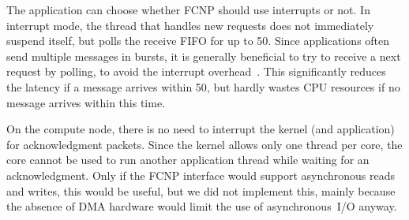 \documentclass[journal]{IEEEtran}
\begin{document}
The application can choose whether FCNP should use interrupts or not.
In interrupt mode, the thread that handles new requests does not immediately
suspend itself, but polls the receive FIFO for up to 50\us.
Since applications often send multiple messages in bursts,
it is generally beneficial to try to receive a next request by polling,
to avoid the interrupt overhead~\cite{Langendoen:96}.
This significantly reduces the latency if a message arrives within 50\us,
but hardly wastes CPU resources if no message arrives within this time.

On the compute node, there is no need to interrupt the kernel (and application)
for acknowledgment packets.
Since the kernel allows only one thread per core, the core cannot be used to
run another application thread while waiting for an acknowledgment.
Only if the FCNP interface would support asynchronous reads and writes, this
would be useful, but we did not implement this, mainly because the absence of
DMA hardware would limit the use of asynchronous~I/O anyway.




%
%
\end{document}
